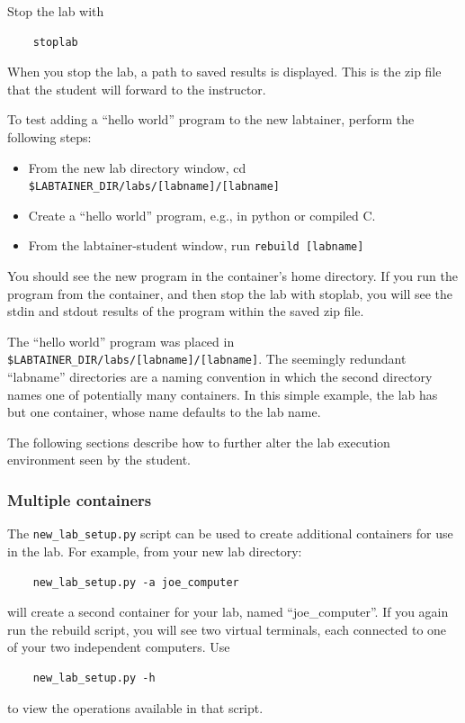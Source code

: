 \documentclass[12pt]{article}
\begin{document}
Stop the lab with 
\begin{verbatim}
    stoplab
\end{verbatim}
When you stop the lab, a path to saved results is displayed.
This is the zip file that the student will forward to the instructor.

To test adding a ``hello world'' program to the new labtainer, perform the following steps:
\begin{itemize}
\item From the new lab directory window, cd \verb!$LABTAINER_DIR/labs/[labname]/[labname]!
\item Create a ``hello world'' program, e.g., in python or compiled C.
\item From the labtainer-student window, run {\tt rebuild [labname]}
\end{itemize}
    
You should see the new program in the container's
home directory.  If you run the program from the container, and then stop the lab
with stoplab, you will see the stdin and stdout results of the program within the
saved zip file.

The ``hello world'' program was placed in \verb!$LABTAINER_DIR/labs/[labname]/[labname]!.
The seemingly redundant ``labname'' directories are a naming convention in which the
second directory names one of potentially many containers.  In this simple example,
the lab has but one container, whose name defaults to the lab name.

The following sections describe how to further alter the lab execution environment seen by 
the student.

\subsubsection {Multiple containers}
The {\tt new\_lab\_setup.py} script can be used to create additional containers for use
in the lab.  For example, from your new lab directory:
\begin{verbatim}
    new_lab_setup.py -a joe_computer
\end{verbatim}
\noindent will create a second container for your lab,
named ``joe\_computer''.  If you again run the rebuild script, you will see two virtual
terminals, each connected to one of your two independent computers.  Use 
\begin{verbatim}
    new_lab_setup.py -h
\end{verbatim}
\noindent to view the operations available in that script.
\end{document}
